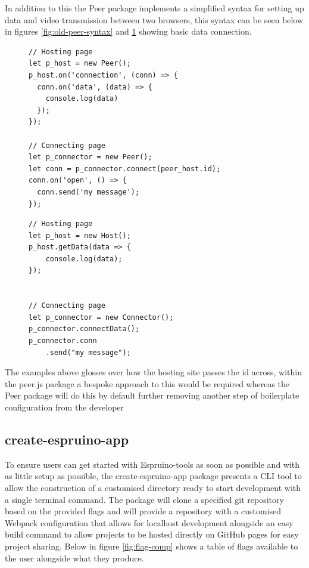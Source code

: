 \documentclass{l4proj}
\begin{document}
\text In addition to this the Peer package implements a simplified syntax for setting up data and video transmission between two browsers, this syntax can be seen below in figures \ref{fig:old-peer-syntax} and \ref{fig:new-peer-syntax} showing basic data connection.

\begin{figure}[!ht]
\centering
\begin{minipage}{7cm}
  \centering
  \begin{lstlisting}
// Hosting page
let p_host = new Peer();
p_host.on('connection', (conn) => {
  conn.on('data', (data) => {
    console.log(data)
  });
});

// Connecting page
let p_connector = new Peer();
let conn = p_connector.connect(peer_host.id);
conn.on('open', () => {
  conn.send('my message');
});
  \end{lstlisting}
  
  \label{fig:old-peer-syntax}
\end{minipage}
\hspace{1cm}
\begin{minipage}{5.5cm}
  \centering
  
  \begin{lstlisting}
// Hosting page
let p_host = new Host();
p_host.getData(data => {
    console.log(data);
});
 

// Connecting page
let p_connector = new Connector();
p_connector.connectData();
p_connector.conn
    .send("my message");

  \end{lstlisting}
  \label{fig:new-peer-syntax}
\end{minipage}
\end{figure}

The examples above glosses over how the hosting site passes the id across, within the peer.js package a bespoke approach to this would be required whereas the Peer package will do this by default further removing another step of boilerplate configuration from the developer


\subsection{create-espruino-app}
To ensure users can get started with Espruino-tools as soon as possible and with as little setup as possible, the create-espruino-app package presents a CLI tool to allow the construction of a customised directory ready to start development with a single terminal command. The package will clone a specified git repository based on the provided flags and will provide a repository with a customised Webpack configuration that allows for localhost development alongside an easy build command to allow projects to be hosted directly on GitHub pages for easy project sharing. Below in figure \ref{fig:flag-comp} shows a table of flags available to the user alongside what they produce.
\end{document}
